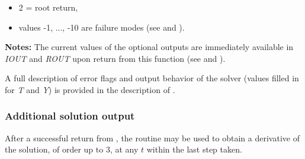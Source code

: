 \documentclass[letterpaper,10pt,english]{sphinxmanual}
\begin{document}
\begin{fulllineitems}
\begin{description}
\begin{itemize}
\begin{itemize}
\item {} 
2 = root return,

\item {} 
values -1, ..., -10 are failure modes (see {\hyperref[c_interface/User_callable:c.ARKode]{\emph{}}} and
{\hyperref[Constants:constants]{\emph{}}}).

\end{itemize}

\end{itemize}

\end{description}

\textbf{Notes:}
The current values of the optional outputs are immediately
available in \emph{IOUT} and \emph{ROUT} upon return from this function (see
{\hyperref[f_interface/Optional_output:finterface-iouttable]{\emph{}}} and {\hyperref[f_interface/Optional_output:finterface-routtable]{\emph{}}}).

A full description of error flags and output behavior of the solver
(values filled in for \emph{T} and \emph{Y}) is provided in the description
of {\hyperref[c_interface/User_callable:c.ARKode]{\emph{}}}.

\end{fulllineitems}



\subsubsection{Additional solution output}
\label{f_interface/Usage:finterface-additionaloutput}\label{f_interface/Usage:additional-solution-output}
After a successful return from {\hyperref[f_interface/Usage:f/_/FARKODE]{\emph{}}}, the routine
{\hyperref[f_interface/Usage:f/_/FARKDKY]{\emph{}}} may be used to obtain a derivative of the solution,
of order up to 3, at any \(t\) within the last step taken.
\end{document}
